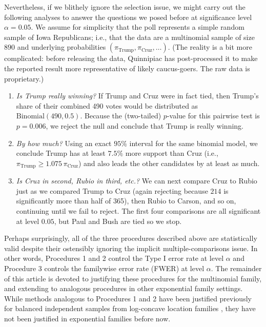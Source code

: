 \documentclass[aos, authoryear]{imsart}
\theoremstyle{definition}
\theoremstyle{custom}
\begin{document}
Nevertheless, if we blithely ignore the selection issue, we might carry out the following analyses to answer the questions we posed before at significance level $\alpha = 0.05$. We assume for simplicity that the poll represents a simple random sample of Iowa Republicans; i.e., that the data are a multinomial sample of size $890$ and underlying probabilities $\left(\pi_{\text{Trump}}, \pi_{\text{Cruz}}, \ldots\right)$. (The reality is a bit more complicated: before releasing the data, Quinnipiac has post-processed it to make the reported result more representative of likely caucus-goers. The raw data is proprietary.)

\begin{enumerate}
\item {\em Is Trump really winning?} If Trump and Cruz were in fact tied, then Trump's share of their combined 490 votes would be distributed as $\text{Binomial}\left(490, 0.5\right)$. Because the (two-tailed) $p$-value for this pairwise test is $p = 0.006$, we reject the null and conclude that Trump is really winning.

\item {\em By how much?} Using an exact $95\%$ interval for the same binomial model, we conclude Trump has at least $7.5\%$ more support than Cruz (i.e., $\pi_{\text{Trump}} \ge 1.075 \,\pi_{\text{Cruz}}$) and also leads the other candidates by at least as much.

\item {\em Is Cruz in second, Rubio in third, etc.?} We can next compare Cruz to Rubio just as we compared Trump to Cruz (again rejecting because $214$ is significantly more than half of 365), then Rubio to Carson, and so on, continuing until we fail to reject. The first four comparisons are all significant at level $0.05$, but Paul and Bush are tied so we stop.
\end{enumerate}

Perhaps surprisingly, all of the three procedures described above are statistically valid despite their ostensibly ignoring the implicit multiple-comparisons issue. In other words, Procedures 1 and 2 control the Type I error rate at level $\alpha$ and Procedure 3 controls the familywise error rate (FWER) at level $\alpha$. The remainder of this article is devoted to justifying these procedures for the multinomial family, and extending to analogous procedures in other exponential family settings. While methods analogous to Procedures 1 and 2 have been justified previously for balanced independent samples from log-concave location families \citep{Gutmann:1987fk,Stefansson:1988wj}, they have not been justified in exponential families before now.
\end{document}
